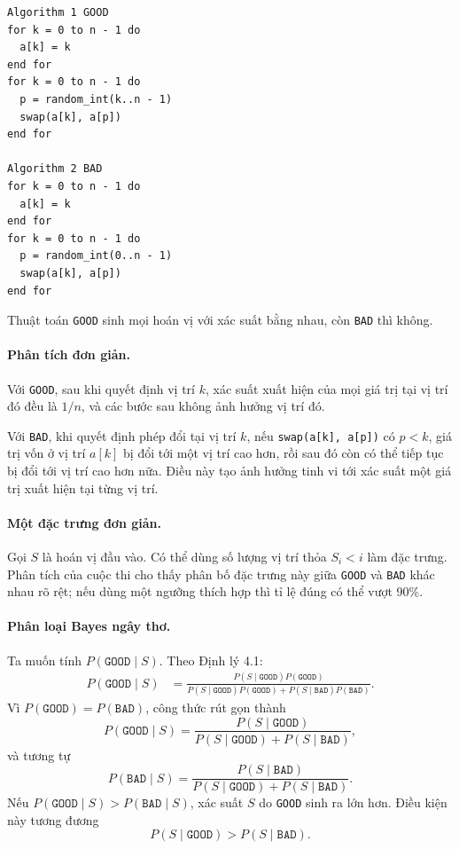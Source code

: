 \documentclass[11pt]{article}
\begin{document}
\begin{verbatim}
Algorithm 1 GOOD
for k = 0 to n - 1 do
  a[k] = k
end for
for k = 0 to n - 1 do
  p = random_int(k..n - 1)
  swap(a[k], a[p])
end for

Algorithm 2 BAD
for k = 0 to n - 1 do
  a[k] = k
end for
for k = 0 to n - 1 do
  p = random_int(0..n - 1)
  swap(a[k], a[p])
end for
\end{verbatim}

Thuật toán \texttt{GOOD} sinh mọi hoán vị với xác suất bằng nhau, còn
\texttt{BAD} thì không.

\paragraph{Phân tích đơn giản.}
Với \texttt{GOOD}, sau khi quyết định vị trí \(k\), xác suất xuất hiện của mọi
giá trị tại vị trí đó đều là \(1/n\), và các bước sau không ảnh hưởng vị trí đó.

Với \texttt{BAD}, khi quyết định phép đổi tại vị trí \(k\), nếu
\texttt{swap(a[k], a[p])} có \(p<k\), giá trị vốn ở vị trí \(a[k]\) bị đổi tới
một vị trí cao hơn, rồi sau đó còn có thể tiếp tục bị đổi tới vị trí cao hơn
nữa. Điều này tạo ảnh hưởng tinh vi tới xác suất một giá trị xuất hiện tại từng
vị trí.

\paragraph{Một đặc trưng đơn giản.}
Gọi \(S\) là hoán vị đầu vào. Có thể dùng số lượng vị trí thỏa \(S_i<i\) làm đặc
trưng. Phân tích của cuộc thi cho thấy phân bố đặc trưng này giữa \texttt{GOOD}
và \texttt{BAD} khác nhau rõ rệt; nếu dùng một ngưỡng thích hợp thì tỉ lệ đúng
có thể vượt 90\%.

\paragraph{Phân loại Bayes ngây thơ.}
Ta muốn tính \(P(\texttt{GOOD}\mid S)\). Theo Định lý 4.1:
\[
\begin{aligned}
P(\texttt{GOOD}\mid S)
&=\frac{P(S\mid\texttt{GOOD})P(\texttt{GOOD})}
{P(S\mid\texttt{GOOD})P(\texttt{GOOD})+
P(S\mid\texttt{BAD})P(\texttt{BAD})}.
\end{aligned}
\]
Vì \(P(\texttt{GOOD})=P(\texttt{BAD})\), công thức rút gọn thành
\[
  P(\texttt{GOOD}\mid S)=
  \frac{P(S\mid\texttt{GOOD})}
  {P(S\mid\texttt{GOOD})+P(S\mid\texttt{BAD})},
\]
và tương tự
\[
  P(\texttt{BAD}\mid S)=
  \frac{P(S\mid\texttt{BAD})}
  {P(S\mid\texttt{GOOD})+P(S\mid\texttt{BAD})}.
\]
Nếu \(P(\texttt{GOOD}\mid S)>P(\texttt{BAD}\mid S)\), xác suất \(S\) do
\texttt{GOOD} sinh ra lớn hơn. Điều kiện này tương đương
\[
  P(S\mid\texttt{GOOD})>P(S\mid\texttt{BAD}).
\]
\end{document}
